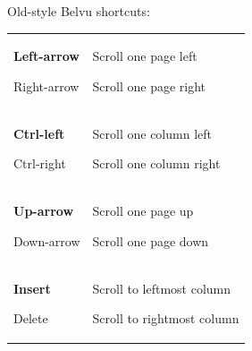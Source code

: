 \documentclass[letterpaper]{article}
\begin{document}
Old-style Belvu shortcuts:

\begin{supertabular}{>{\bfseries}p{0.2\textwidth} p{0.8\textwidth}}
Left-arrow

Right-arrow &
Scroll one page left

Scroll one page right\\
Ctrl-left

Ctrl-right &
Scroll one column left

Scroll one column right\\
Up-arrow

Down-arrow &
Scroll one page up

Scroll one page down\\
Insert

Delete &
Scroll to leftmost column

Scroll to rightmost column\\
\end{supertabular}
\end{document}
